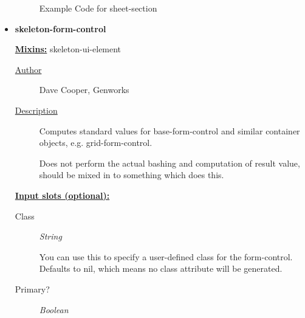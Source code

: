 \documentclass [11pt]{book}
\begin{document}
\begin{itemize}
\begin{figure}
\begin{lrbox}{\boxedverb}
\begin{minipage}{\linewidth}
{\begin{verbatim}
\end{verbatim}}
\end{minipage}
\end{lrbox}
\fbox{\usebox{\boxedverb}}

\caption{Example Code for sheet-section}

\label{fig:example-code-sheet-section}

\end{figure}






\item {}
\label{prim:skeleton-form-control}
\textbf{skeleton-form-control}


\textbf{
\underline{Mixins:}} skeleton-ui-element





\begin{description}

\item [
\underline{Author}]


Dave Cooper, Genworks



\item [
\underline{Description}]


Computes standard values for base-form-control and similar container objects, e.g. grid-form-control.

Does not perform the actual bashing and computation of result value, should be mixed in to something which does this.



\end{description}








\textbf{
\underline{Input slots (optional):}}

\begin{description}

\item [Class]
\emph{String}

 You can use this to specify a user-defined class for the form-control. Defaults to nil, which means no class attribute will be generated.




\item [Primary?]
\emph{Boolean}


\end{description}
\end{itemize}
\end{document}
